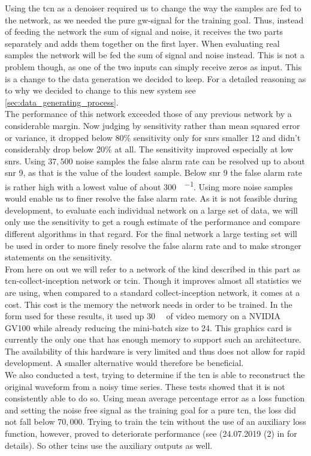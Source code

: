 Using the \gls{tcn} as a denoiser required us to change the way the samples are fed to the network, as we needed the pure \gls{gw}-signal for the training goal. Thus, instead of feeding the network the sum of signal and noise, it receives the two parts separately and adds them together on the first layer. When evaluating real samples the network will be fed the sum of signal and noise instead. This is not a problem though, as one of the two inputs can simply receive zeros as input. This is a change to the data generation we decided to keep. For a detailed reasoning as to why we decided to change to this new system see \autoref{sec:data_generating_process}.\\
The performance of this network exceeded those of any previous network by a considerable margin. Now judging by sensitivity rather than mean squared error or variance, it dropped below 80\% sensitivity only for \gls{snr}s smaller 12 and didn't considerably drop below 20\% at all. The sensitivity improved especially at low \gls{snr}s. Using $37,500$ noise samples the false alarm rate can be resolved up to about \gls{snr} 9, as that is the value of the loudest sample. Below \gls{snr} 9 the false alarm rate is rather high with a lowest value of about \SI[per-mode=fraction]{300}{\samples\per\month}. Using more noise samples would enable us to finer resolve the false alarm rate. As it is not feasible during development, to evaluate each individual network on a large set of data, we will only use the sensitivity to get a rough estimate of the performance and compare different algorithms in that regard. For the final network a large testing set will be used in order to more finely resolve the false alarm rate and to make stronger statements on the sensitivity.\\
From here on out we will refer to a network of the kind described in this part as \gls{tcn}-collect-inception network or \gls{tcin}. Though it improves almost all statistics we are using, when compared to a standard collect-inception network, it comes at a cost. This cost is the memory the network needs in order to be trained. In the form used for these results, it used up \SI{30}{\giga\byte} of video memory on a NVIDIA GV100 while already reducing the mini-batch size to 24. This graphics card is currently the only one that has enough memory to support such an architecture. The availability of this hardware is very limited and thus does not allow for rapid development. A smaller alternative would therefore be beneficial.\\
We also conducted a test, trying to determine if the \gls{tcn} is able to reconstruct the original waveform from a noisy time series. These tests showed that it is not consistently able to do so. Using mean average percentage error as a loss function and setting the noise free signal as the training goal for a pure \gls{tcn}, the loss did not fall below $70,000$. Trying to train the \gls{tcin} without the use of an auxiliary loss function, however, proved to deteriorate performance (see (24.07.2019 (2) in \cite{network_wiki} for details). So other \gls{tcin}s use the auxiliary outputs as well.\medskip\\
